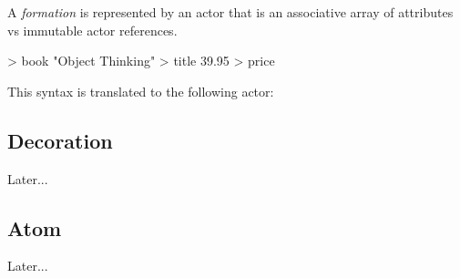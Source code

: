 A \emph{formation} is represented by an actor that is an associative array of attributes vs immutable actor references.

\begin{ffcode}
[isbn] > book
  "Object Thinking" > title
  39.95 > price
\end{ffcode}

This syntax is translated to the following actor:


\subsection{Decoration}

Later...

\subsection{Atom}

Later...
